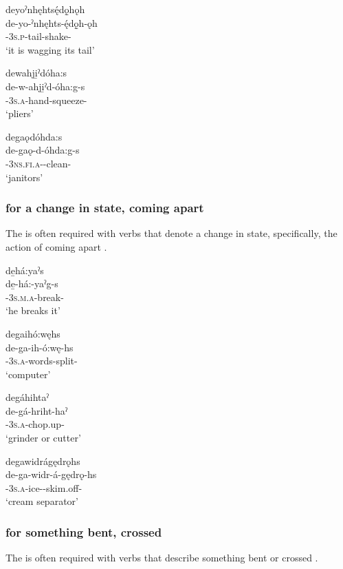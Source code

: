 \ex deyoˀnhęhtsę́dǫ̱hǫh\\
\gll de-yo-ˀnhęhts-ę́dǫ̱h-ǫh\\
{\dual}-\textsc{3s.p}-tail-shake-{\stative}\\
\glt `it is wagging its tail'

\ex dewahji̱ˀdóha:s\\
\gll de-w-ahji̱ˀd-óha:g-s\\
{\dual}-\textsc{3s.a}-hand-squeeze-{\habitual}\\
\glt `pliers'

\ex degaǫdóhda:s\\
\gll de-gaǫ-d-óhda:g-s\\
{\dual}-\textsc{3ns.fi.a}-{\semireflexive}-clean-{\habitual}\\
\glt `janitors'
\z
\z

\subsubsection*{ {\dualic} for a change in state, coming apart} \label{[de-] (dualic) for a change in state, coming apart}
The  {\dualic} is often required with verbs that denote a change in state, specifically, the action of coming apart .
 
\ea\label{ex:detwoex2}

\ea de̱há:yaˀs\\
\gll de̱-há:-yaˀg-s\\
{\dual}-\textsc{3s.m.a}-break-{\habitual}\\
\glt `he breaks it'

\ex degaihó:węhs\\
\gll de-ga-ih-ó:wę-hs\\
{\dualic}-\textsc{3s.a}-words-split-{\habitual}\\
\glt `computer'

\ex degáhihtaˀ\\
\gll de-gá-hriht-haˀ\\
{\dualic}-\textsc{3s.a}-chop.up-{\habitual}\\
\glt `grinder or cutter'

\ex degawidrágędrǫhs\\
\gll de-ga-widr-á-gędrǫ-hs\\
{\dualic}-\textsc{3s.a}-ice-{\joinerA}-skim.off-{\habitual}\\
\glt `cream separator'
\z
\z

\largerpage
\subsubsection*{ {\dualic} for something bent, crossed} \label{[de-] (dualic) for something bent, crossed}
The  {\dualic} is often required with verbs that describe something bent or crossed .

